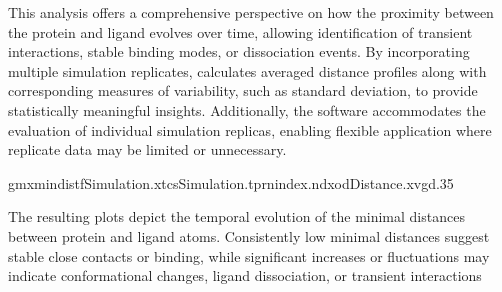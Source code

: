 \documentclass[a4paper,10pt,english]{sphinxmanual}
\begin{document}
\sphinxAtStartPar
This analysis offers a comprehensive perspective on how the proximity between the protein and ligand evolves over time, allowing identification of transient interactions, stable binding modes, or dissociation events. By incorporating multiple simulation replicates,  calculates averaged distance profiles along with corresponding measures of variability, such as standard deviation, to provide statistically meaningful insights. Additionally, the software accommodates the evaluation of individual simulation replicas, enabling flexible application where replicate data may be limited or unnecessary.

\sphinxAtStartPar
{}

\begin{sphinxVerbatim}[commandchars=\\\{\}]
gmxmindist\PYGZhy{}fSimulation.xtc\PYGZhy{}sSimulation.tpr\PYGZhy{}nindex.ndx\PYGZhy{}odDistance.xvg\PYGZhy{}d.35
\end{sphinxVerbatim}

\begin{sphinxVerbatim}[commandchars=\\\{\}]
   
\end{sphinxVerbatim}

\noindent{}

\sphinxAtStartPar
{} The resulting plots depict the temporal evolution of the minimal distances between protein and ligand atoms. Consistently low minimal distances suggest stable close contacts or binding, while significant increases or fluctuations may indicate conformational changes, ligand dissociation, or transient interactions

\begin{sphinxVerbatim}[commandchars=\\\{\}]
  
\end{sphinxVerbatim}
\end{document}
